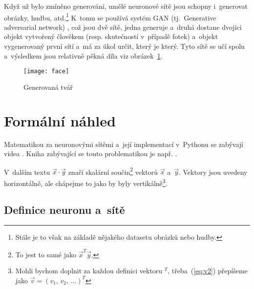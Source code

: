 \documentclass[12pt]{report}			%
\begin{document}
					Když už bylo zmíněno generování, umělé neuronové sítě jsou schopny i~generovat obrázky, hudbu, atd.\footnote{Stále je to však na základě nějakého datasetu obrázků nebo hudby.} K~tomu se používá systém GAN (tj.~Generative adversarial network) \autocite{art:GAN}, což jsou dvě sítě, jedna generuje a~druhá dostane dvojici objekt vytvořený člověkem (resp. skutečností v~případě fotek) a~objekt vygenerovaný první sítí a~má za úkol určit, který je který. Tyto sítě se učí spolu a~výsledkem jsou relativně pěkná díla viz obrázek~\ref{fig:face}.
					
					\begin{figure}
						\centering
						\texttt{[image: face]}
						\caption{Generovaná tvář \autocite{online:Face}}
						\label{fig:face}
					\end{figure}
			
			
			\chapter{Formální náhled} \label{s:fn}
			
				Matematikou za neuronovými sítěmi a~její implementací v~Pythonu se zabývají videa \autocite{vid:NN}. Kniha zabývající se touto problematikou je např. \autocite{book:NN}.
				
				V~dalším textu $\vec{x}\cdot\vec{y}$ značí skalární součin\footnote{To jest to samé jako $\vec{x}^T\vec{y}$.} vektorů $\vec{x}$ a~$\vec{y}$. Vektory jsou uvedeny horizontálně, ale chápejme to jako by byly vertikálně\footnote{Mohli bychom doplnit za každou definici vektoru $^T$, třeba~(\ref{eq:v2}) přepíšeme jako $\vec{v} = \left(v_{1},\,v_{2},\,\ldots\right)^T$}.

				\section{Definice neuronu a~sítě} \label{s:neuron}
					
\end{document}
